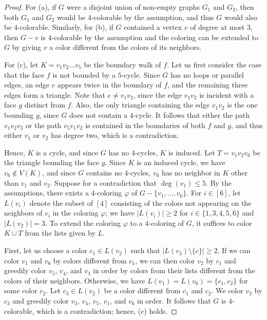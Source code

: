 \documentclass[12pt,twoside,openright,a4paper]{book}
\begin{document}
\begin{proof}
For (a), if $G$ were a disjoint union of non-empty graphs $G_1$ and $G_2$, then both $G_1$ and $G_2$ would be
$4$-colorable by the assumption, and thus $G$ would also be $4$-colorable.  Similarly, for (b), if $G$ contained a vertex $v$ of
degree at most $3$, then $G-v$ is $4$-colorable by the assumption and the coloring can be extended to $G$ by giving $v$ a color
different from the colors of its neighbors.

For (c), let $K=v_1v_2\ldots v_5$ be the boundary walk of $f$.  Let us first consider the case that the face $f$ is not bounded by a $5$-cycle.
Since $G$ has no loops or parallel
edges, an edge $e$ appears twice in the boundary of $f$, and the remaining three edges form a triangle.  Note that $e\neq v_1v_2$,
since the edge $v_1v_2$ is incident with a face $g$ distinct from $f$.  Also, the only triangle containing the edge $v_1v_2$
is the one bounding $g$, since $G$ does not contain a $4$-cycle.  It follows that either the path $v_1v_2v_3$ or the path $v_5v_1v_2$
is contained in the boundaries of both $f$ and $g$, and thus either $v_1$ or $v_2$ has degree two, which is a contradiction.

Hence, $K$ is a cycle, and since $G$ has no $4$-cycles, $K$ is induced.  Let $T=v_1v_2v_6$ be the triangle bounding the face $g$.
Since $K$ is an induced cycle, we have $v_6\not\in V(K)$, and since $G$ contains no $4$-cycles, $v_6$ has no neighbor in $K$ other
than $v_1$ and $v_2$.  Suppose for a contradiction that $\deg(v_1)\le 5$.  By the assumptions, there exists a $4$-coloring $\varphi$
of $G-\{v_1,\ldots, v_6\}$.  For $i\in[6]$, let $L(v_i)$ denote the subset of $[4]$ consisting of the colors not
appearing on the neighbors of $v_i$ in the coloring $\varphi$; we have $|L(v_i)|\ge 2$ for $i\in\{1,3,4,5,6\}$ and $|L(v_2)|=3$.
To extend the coloring $\varphi$ to a $4$-coloring of $G$, it suffices to color $K\cup T$ from the lists given by $L$.

First, let us choose a color $c_1\in L(v_2)$ such that $|L(v_3)\setminus\{c\}|\ge 2$.  If we can color $v_1$ and $v_6$ by colors
different from $c_1$, we can then color $v_2$ by $c_1$ and greedily color $v_5$, $v_4$, and $v_3$ in order by colors from their lists different from
the colors of their neighbors.  Otherwise, we have $L(v_1)=L(v_6)=\{c_1,c_2\}$ for some color $c_2$.
Let $c_3\in L(v_2)$ be a color different from $c_1$ and $c_2$.  We color $v_2$ by $c_3$ and greedily color $v_3$, $v_4$, $v_5$, $v_1$, and $v_6$
in order.  It follows that $G$ is $4$-colorable, which is a contradiction; hence, (c) holds.


\end{proof}
\end{document}
